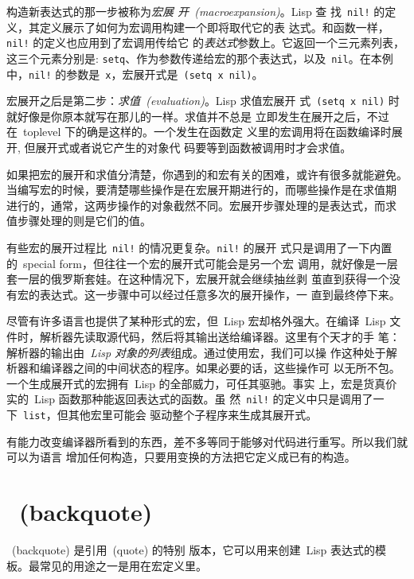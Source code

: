 构造新表达式的那一步被称为\emph{宏展
  开~(macroexpansion)}。Lisp 查
找~\texttt{nil!} 的定义，其定义展示了如何为宏调用构建一个即将取代它的表
达式。和函数一样，\texttt{nil!} 的定义也应用到了宏调用传给它
的\emph{表达式}参数上。它返回一个三元素列表，这三个元素分别是:
\texttt{setq}、作为参数传递给宏的那个表达式，以及~\texttt{nil}。在本例
中，\texttt{nil!} 的参数是~\texttt{x}，宏展开式是~\texttt{(setq x
  nil)}。

宏展开之后是第二步：\emph{求值~(evaluation)}。Lisp 求值宏展开
式~\texttt{(setq x nil)} 时就好像是你原本就写在那儿的一样。求值并不总是
立即发生在展开之后，不过在~toplevel 下的确是这样的。一个发生在函数定
义里的宏调用将在函数编译时展开, 但展开式\pozhehao{}或者说它产生的对象代
码\pozhehao{}要等到函数被调用时才会求值。

如果把宏的展开和求值分清楚，你遇到的和宏有关的困难，或许有很多就能避免。
当编写宏的时候，要清楚哪些操作是在宏展开期进行的，而哪些操作是在求值期
进行的，通常，这两步操作的对象截然不同。宏展开步骤处理的是表达式，而求
值步骤处理的则是它们的值。

有些宏的展开过程比~\texttt{nil!} 的情况更复杂。\texttt{nil!} 的展开
式只是调用了一下内置的~special form，但往往一个宏的展开式可能会是另一个宏
调用，就好像是一层套一层的俄罗斯套娃。在这种情况下，宏展开就会继续抽丝剥
茧直到获得一个没有宏的表达式。这一步骤中可以经过任意多次的展开操作，一
直到最终停下来。

尽管有许多语言也提供了某种形式的宏，但~Lisp 宏却格外强大。在编译~Lisp
文件时，解析器先读取源代码，然后将其输出送给编译器。这里有个天才的手
笔：解析器的输出由\emph{~Lisp 对象的列表}组成。通过使用宏，我们可以操
作这种处于解析器和编译器之间的中间状态的程序。如果必要的话，这些操作可
以无所不包。一个生成展开式的宏拥有~Lisp 的全部威力，可任其驱驰。事实
上，宏是货真价实的~Lisp 函数\pozhehao{}那种能返回表达式的函数。虽
然~\texttt{nil!} 的定义中只是调用了一下~\texttt{list}，但其他宏里可能会
驱动整个子程序来生成其展开式。

有能力改变编译器所看到的东西，差不多等同于能够对代码进行重写。所以我们就可以为语言
增加任何构造，只要用变换的方法把它定义成已有的构造。

\section{\bq{}~(backquote)}
\label{sec:backquote}

\bq{}~(backquote) 是引用~(quote) 的特别
版本，它可以用来创建~Lisp 表达式的模板。\bq{}最常见的用途之一是用在宏定义里。

